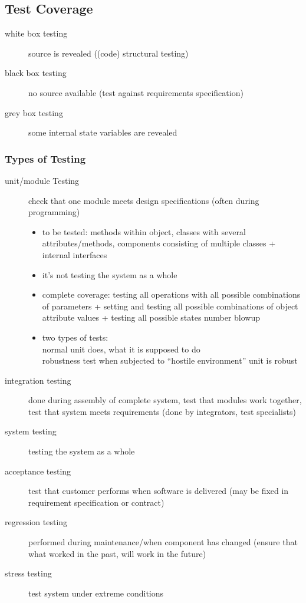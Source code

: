 \documentclass[a4paper, 10pt]{article}
\begin{document}
\subsection*{Test Coverage}
\begin{description}
	\item[white box testing] source is revealed ((code) structural testing)
	\item[black box testing] no source available (test against requirements specification)
	\item[grey box testing] some internal state variables are revealed
\end{description}
\subsubsection*{Types of Testing}

\begin{description}
	\item[unit/module Testing] check that one module meets design specifications (often during programming)
	\begin{itemize}
		\item to be tested: methods within object, classes with several attributes/methods, components consisting of multiple classes + internal interfaces
		\item it's not testing the system as a whole
		\item complete coverage: testing all operations with all possible combinations of parameters + setting and testing all possible combinations of object attribute values + testing all possible states \follows number blowup
		\item two types of tests:\\
		normal \follows unit does, what it is supposed to do \\
		robustness test \follows when subjected to ``hostile environment'' unit is robust
	\end{itemize}
	\item[integration testing] done during assembly  of complete system, test that modules work together, test that system meets requirements (done by integrators, test specialists)
	\item[system testing] testing the system as a whole
	\item[acceptance testing] test that customer performs when software is delivered (may be fixed in requirement specification or contract)
	\item[regression testing] performed during maintenance/when component has changed (ensure that what worked in the past, will work in the future)
	\item[stress testing] test system under extreme conditions
\end{description}
\end{document}
